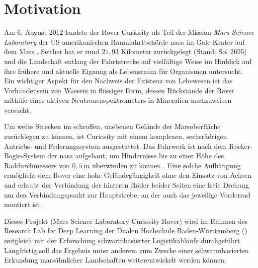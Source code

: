 



\section{Motivation}
\label{sec:motivation}

Am 6. August 2012 landete der Rover Curiosity als Teil der Mission \textit{Mars Science Laboratory} der US-amerikanischen Raumfahrtbehörde \acf{nasa} im Gale-Krater auf dem Mars \cite{vasavada2014}.
Seither hat er rund $21{,}93$ Kilometer zurückgelegt (Stand: Sol 2695) \cite{nasa2020} und die Landschaft entlang der Fahrtstrecke auf vielfältige Weise im Hinblick auf ihre frühere und aktuelle Eignung als Lebensraum für Organismen untersucht.
Ein wichtiger Aspekt für den Nachweis der Existenz von Lebewesen ist das Vorhandensein von Wassers \cite{nasa2013} in flüssiger Form, dessen Rückstände der Rover mithilfe eines aktiven Neutronenspektrometers in Mineralien nachzuweisen versucht. \cite{vasavada2014}

Um weite Strecken im schroffen, unebenen Gelände der Marsoberfläche zurücklegen zu können, ist Curiosity mit einem komplexen, sechsrädrigen Antriebs- und Federungssystem ausgestattet.
Das Fahrwerk ist nach dem Rocker-Bogie-System der \acs{nasa} aufgebaut, um Hindernisse bis zu einer Höhe des Raddurchmessers von $0{,}5\ m$ überwinden zu können \cite{arvidson2013}.
Eine solche Aufhängung ermöglicht dem Rover eine hohe Geländegängigkeit ohne den Einsatz von Achsen und erlaubt der Verbindung der hinteren Räder beider Seiten eine freie Drehung um den Verbindungspunkt zur Hauptstrebe, an der auch das jeweilige Vorderrad montiert ist \cite{bickler1998}. 


Dieses Projekt (Mars Science Laboratory Curiosity Rover) wird im Rahmen des Research Lab for Deep Learning der Dualen Hochschule Baden-Württemberg () zeitgleich mit der Erforschung schwarmbasierter Logistikabläufe durchgeführt.
Langfristig soll das Ergebnis unter anderem zum Zwecke einer schwarmbasierten Erkundung marsähnlicher Landschaften weiterentwickelt werden können.

